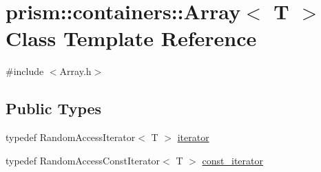 \hypertarget{classprism_1_1containers_1_1_array}{}\section{prism\+:\+:containers\+:\+:Array$<$ T $>$ Class Template Reference}
\label{classprism_1_1containers_1_1_array}


{\ttfamily \#include $<$Array.\+h$>$}

\subsection*{Public Types}
\begin{DoxyCompactItemize}
\item 
typedef Random\+Access\+Iterator$<$ T $>$ \hyperlink{classprism_1_1containers_1_1_array_af5e3ad470f2bb2d24f0f98e12e11a60b}{iterator}
\item 
typedef Random\+Access\+Const\+Iterator$<$ T $>$ \hyperlink{classprism_1_1containers_1_1_array_a9cf61ea4548f20cae51d2ddcc83f9a16}{const\+\_\+iterator}
\end{DoxyCompactItemize}
